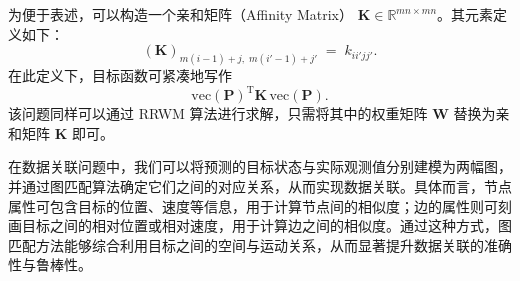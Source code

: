 为便于表述，可以构造一个亲和矩阵（Affinity Matrix） $\mathbf K \in \mathbb R^{mn \times mn}$。其元素定义如下：
\[
    (\mathbf K)_{m(i-1)+j,\;m(i'-1)+j'} \;=\; k_{ii'jj'}.
\]
在此定义下，目标函数可紧凑地写作
\[
    \mathrm{vec}(\mathbf P)^{\mathrm T} \mathbf K \, \mathrm{vec}(\mathbf P).
\]
该问题同样可以通过 RRWM 算法进行求解，只需将其中的权重矩阵 $\mathbf W$ 替换为亲和矩阵 $\mathbf K$ 即可。

在数据关联问题中，我们可以将预测的目标状态与实际观测值分别建模为两幅图，并通过图匹配算法确定它们之间的对应关系，从而实现数据关联。具体而言，节点属性可包含目标的位置、速度等信息，用于计算节点间的相似度；边的属性则可刻画目标之间的相对位置或相对速度，用于计算边之间的相似度。通过这种方式，图匹配方法能够综合利用目标之间的空间与运动关系，从而显著提升数据关联的准确性与鲁棒性。
